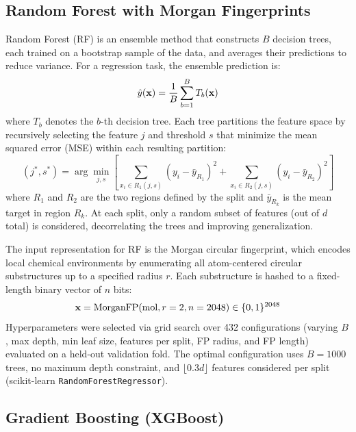 \FloatBarrier
\subsection{Random Forest with Morgan Fingerprints}
\label{sec:rf}

Random Forest (RF)\cite{breiman2001random} is an ensemble method that constructs $B$ decision trees, each trained on a bootstrap sample of the data, and averages their predictions to reduce variance.
For a regression task, the ensemble prediction is:
\begin{equation}
    \hat{y}(\mathbf{x}) = \frac{1}{B} \sum_{b=1}^{B} T_b(\mathbf{x})
\end{equation}
where $T_b$ denotes the $b$-th decision tree.
Each tree partitions the feature space by recursively selecting the feature $j$ and threshold $s$ that minimize the mean squared error (MSE) within each resulting partition:
\begin{equation}
    (j^*, s^*) = \arg\min_{j, s} \left[ \sum_{x_i \in R_1(j,s)} (y_i - \bar{y}_{R_1})^2 + \sum_{x_i \in R_2(j,s)} (y_i - \bar{y}_{R_2})^2 \right]
\end{equation}
where $R_1$ and $R_2$ are the two regions defined by the split and $\bar{y}_{R_k}$ is the mean target in region $R_k$.
At each split, only a random subset of features (out of $d$ total) is considered, decorrelating the trees and improving generalization.

The input representation for RF is the Morgan circular fingerprint\cite{rogers2010extended}, which encodes local chemical environments by enumerating all atom-centered circular substructures up to a specified radius $r$.
Each substructure is hashed to a fixed-length binary vector of $n$ bits:
\begin{equation}
    \mathbf{x} = \text{MorganFP}(\text{mol}, r=2, n=2048) \in \{0, 1\}^{2048}
\end{equation}
Hyperparameters were selected via grid search over 432 configurations (varying $B$, max depth, min leaf size, features per split, FP radius, and FP length) evaluated on a held-out validation fold.
The optimal configuration uses $B = 1000$ trees, no maximum depth constraint, and $\lfloor 0.3d \rfloor$ features considered per split (scikit-learn \texttt{RandomForestRegressor}).


\subsection{Gradient Boosting (XGBoost)}
\label{sec:xgboost}

